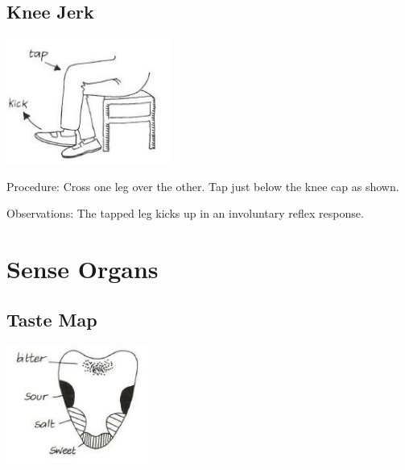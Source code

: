 \begin{multicols}{2}
\subsection{Knee Jerk}

\begin{center}
\includegraphics[width=0.4\textwidth]{./img/vso/knee-jerk.jpg}
\end{center}

\begin{description*}
\item[Procedure:]{Cross one leg over the other. Tap
just below the knee cap as shown.
}
\item[Observations:]{The tapped leg kicks up in an
involuntary reflex response.}
\end{description*}


\section*{Sense Organs}


\subsection{Taste Map}

\begin{center}
\includegraphics[width=0.35\textwidth]{./img/vso/taste-map.jpg}
\end{center}


\end{multicols}

